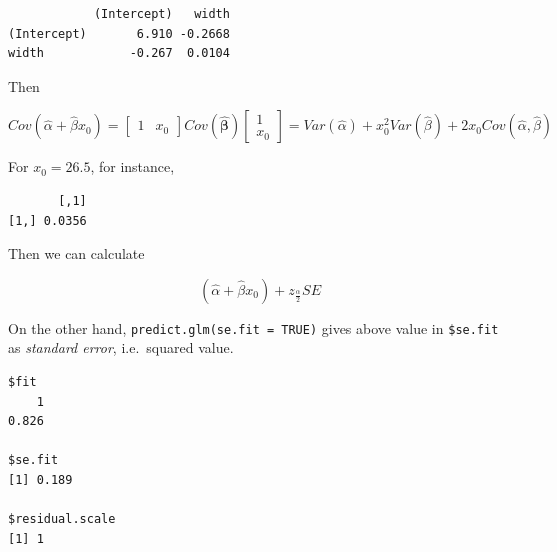 \documentclass[]{book}
\newenvironment{Shaded}{\begin{snugshade}}{\end{snugshade}}
\newcommand{\DataTypeTok}[1]{\textcolor[rgb]{0.13,0.29,0.53}{#1}}
\newcommand{\DecValTok}[1]{\textcolor[rgb]{0.00,0.00,0.81}{#1}}
\newcommand{\FloatTok}[1]{\textcolor[rgb]{0.00,0.00,0.81}{#1}}
\newcommand{\KeywordTok}[1]{\textcolor[rgb]{0.13,0.29,0.53}{\textbf{#1}}}
\newcommand{\NormalTok}[1]{#1}
\newcommand{\OperatorTok}[1]{\textcolor[rgb]{0.81,0.36,0.00}{\textbf{#1}}}
\newcommand{\OtherTok}[1]{\textcolor[rgb]{0.56,0.35,0.01}{#1}}
\newcommand{\StringTok}[1]{\textcolor[rgb]{0.31,0.60,0.02}{#1}}
\begin{document}
\begin{verbatim}
            (Intercept)   width
(Intercept)       6.910 -0.2668
width            -0.267  0.0104
\end{verbatim}

Then

\[Cov(\hat\alpha + \hat\beta x_0) = \left[\begin{array}{cc} 1 & x_0 \end{array}\right] Cov(\boldsymbol{\hat\beta})\left[\begin{array}{c} 1 \\ x_0 \end{array}\right] = Var(\hat\alpha) + x_0^2Var(\hat\beta) + 2x_0Cov(\hat\alpha, \hat\beta)\]

For \(x_0 = 26.5\), for instance,

\begin{Shaded}
\end{Shaded}

\begin{verbatim}
       [,1]
[1,] 0.0356
\end{verbatim}

Then we can calculate

\[(\hat\alpha + \hat\beta x_0) + z_{\frac{\alpha}{2}} SE\]

On the other hand, \texttt{predict.glm(se.fit\ =\ TRUE)} gives above value in \texttt{\$se.fit} as \emph{standard error}, i.e.~squared value.

\begin{Shaded}
\end{Shaded}

\begin{verbatim}
$fit
    1 
0.826 

$se.fit
[1] 0.189

$residual.scale
[1] 1
\end{verbatim}
\end{document}
